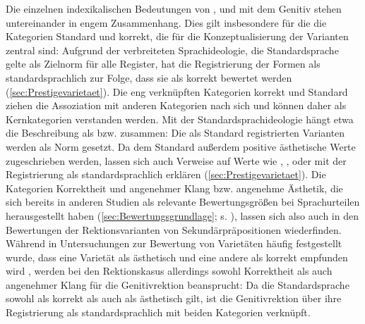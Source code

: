 \begin{sloppypar}
Die einzelnen indexikalischen Bedeutungen von \wegen, \waehrend{} und \dank{} mit dem Genitiv stehen untereinander in engem Zusammenhang.
Dies gilt insbesondere für die die Kategorien \glqq Standard\grqq{} und \glqq korrekt\grqq, die für die Konzeptualisierung der Varianten zentral sind:
Aufgrund der verbreiteten Sprachideologie, die Standardsprache gelte als Zielnorm für alle Register, hat die Registrierung der Formen als standardsprachlich zur Folge, dass sie als korrekt bewertet werden (\autoref{sec:Prestigevarietaet}). 
Die eng verknüpften Kategorien \glqq korrekt\grqq{} und \glqq Standard\grqq{} ziehen die Assoziation mit anderen Kategorien nach sich und können daher als Kernkategorien verstanden werden.  
Mit der Standardsprachideologie hängt etwa die Beschreibung als  bzw.  zusammen:
Die als Standard registrierten Varianten werden als Norm gesetzt. 
Da dem Standard außerdem positive ästhetische Werte zugeschrieben werden, lassen sich auch Verweise auf Werte wie , ,  oder  mit der Registrierung als standardsprachlich erklären (\autoref{sec:Prestigevarietaet}). 
Die Kategorien Korrektheit und angenehmer Klang bzw. angenehme Ästhetik, die sich bereits in anderen Studien als relevante Bewertungsgrößen bei Sprachurteilen herausgestellt haben (\autoref{sec:Bewertungsgrundlage}; s. \citealp{Preston2004}), lassen sich also auch in den Bewertungen der Rektionsvarianten von Sekundärpräpositionen wiederfinden.
Während in Untersuchungen zur Bewertung von Varietäten häufig festgestellt wurde, dass eine Varietät als ästhetisch und eine andere als korrekt empfunden wird \citep[s. etwa][53]{Preston2004}, werden bei den Rektionskasus allerdings sowohl Korrektheit als auch angenehmer Klang für die Genitivrektion beansprucht: 
Da die Standardsprache sowohl als korrekt als auch als ästhetisch gilt, ist die Genitivrektion über ihre Registrierung als standardsprachlich mit beiden Kategorien verknüpft. 
\end{sloppypar}


